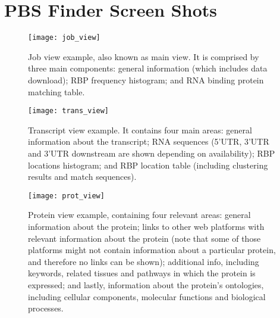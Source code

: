 \chapter{PBS Finder Screen Shots}\label{appendix:screenshots}

\begin{figure}[H]
  \begin{center}
    \leavevmode
    \texttt{[image: job\_view]}
    \caption[Job view example]{
      Job view example, also known as main view. It is comprised by three main
      components: general information (which includes data download); RBP
      frequency histogram; and RNA binding protein matching table.
    }
    \label{fig:job_view}
  \end{center}
\end{figure}

\begin{figure}[!htb]
  \begin{center}
    \leavevmode
    \texttt{[image: trans\_view]}
    \caption[Transcript view example]{
      Transcript view example. It contains four main areas: general information
      about the transcript; RNA sequences (5’UTR, 3’UTR and 3’UTR downstream are
      shown depending on availability); RBP locations histogram; and RBP
      location table (including clustering results and match sequences).
    }
    \label{fig:trans_view}
  \end{center}
\end{figure}

\begin{figure}[!htb]
  \begin{center}
    \leavevmode
    \texttt{[image: prot\_view]}
    \caption[Protein view example]{
      Protein view example, containing four relevant areas: general information
      about the protein; links to other web platforms with relevant information
      about the protein (note that some of those platforms might not contain
      information about a particular protein, and therefore no links can be
      shown); additional info, including keywords, related tissues and pathways
      in which the protein is expressed; and lastly, information about the
      protein's ontologies, including cellular components, molecular functions
      and biological processes.
    }
    \label{fig:prot_view}
  \end{center}
\end{figure}


